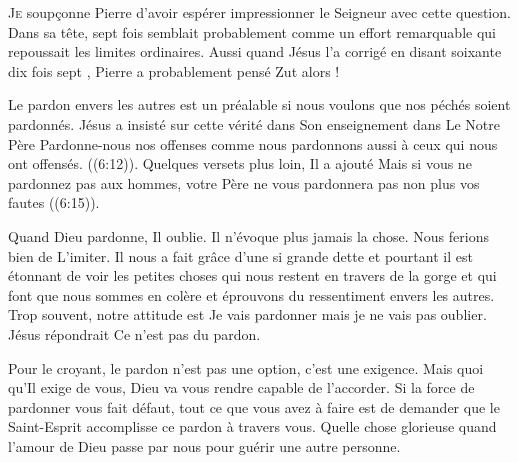 


\lettrine{J}{e} soup\c{c}onne Pierre d'avoir espérer impressionner le Seigneur
 avec cette question. Dans sa tête, \Og sept fois \Fg{} semblait probablement
 comme un effort remarquable qui repoussait les limites ordinaires.
 Aussi quand Jésus l'a corrigé en disant \Og soixante dix fois sept \Fg{},
 Pierre a probablement pensé\frcolon{} \Og Zut alors ! \Fg{}

Le pardon envers les autres est un préalable si nous voulons
 que nos péchés soient pardonnés. Jésus a insisté sur cette vérité
 dans Son enseignement dans \Og Le Notre Père \Fg{}\frcolon{} 
 \Og Pardonne-nous nos offenses comme nous pardonnons aussi
 à ceux qui nous ont offensés. \Fg{} 
 ((6:12)). Quelques versets plus loin, Il a ajouté\frcolon{} 
 \Og Mais si vous ne pardonnez pas aux hommes,
 votre Père ne vous pardonnera pas non plus vos fautes \Fg{} 
 ((6:15)). 


Quand Dieu pardonne, Il oublie. Il n'évoque plus jamais la chose.
 Nous ferions bien de L'imiter. Il nous a fait grâce d'une si grande dette
 et pourtant il est étonnant de voir les petites choses
 qui nous restent en travers de la gorge et qui font que nous sommes en colère
 et éprouvons du ressentiment envers les autres.
 Trop souvent, notre attitude est\frcolon{} 
 \Og Je vais pardonner \ocadr mais je ne vais pas oublier. \Fg{}
 Jésus répondrait\frcolon{} \Og Ce n'est pas du pardon. \Fg{}

Pour le croyant, le pardon n'est pas une option, c'est une exigence.
 Mais quoi qu'Il  exige de vous, Dieu va vous rendre
 capable de l'accorder. Si la force de pardonner vous fait défaut,
 tout ce que vous avez à faire est de demander que le Saint-Esprit
 accomplisse ce pardon à travers vous.
 Quelle chose glorieuse quand l'amour de Dieu passe par nous pour guérir
 une autre personne. 

